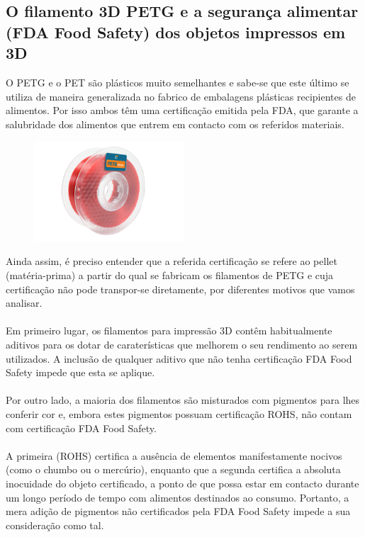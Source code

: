 \documentclass[11pt,a4paper]{article}
\begin{document}
	\subsection{O filamento 3D PETG e a segurança alimentar (FDA Food Safety) dos objetos impressos em 3D}O PETG e o PET são plásticos muito semelhantes e sabe-se que este último se utiliza de maneira generalizada no fabrico de embalagens plásticas recipientes de alimentos. Por isso ambos têm uma certificação emitida pela FDA, que garante a salubridade dos alimentos que entrem em contacto com os referidos materiais.
\begin{figure}[H]
\centering
\includegraphics[width=0.5\textwidth,cfbox=azul_marcos 1pt 0pt]{FOTOS/PETGKILOROJO}
\end{figure}
Ainda assim, é preciso entender que a referida certificação se refere ao pellet (matéria-prima) a partir do qual se fabricam os filamentos de PETG e cuja certificação não pode transpor-se diretamente, por diferentes motivos que vamos analisar.
\\\\
Em primeiro lugar, os filamentos para impressão 3D contêm habitualmente aditivos para os dotar de caraterísticas que melhorem o seu rendimento ao serem utilizados. A inclusão de qualquer aditivo que não tenha certificação FDA Food Safety impede que esta se aplique.
\\\\
Por outro lado, a maioria dos filamentos são misturados com pigmentos para lhes conferir cor e, embora estes pigmentos possuam certificação ROHS, não contam com certificação FDA Food Safety.
\\\\
A primeira (ROHS) certifica a ausência de elementos manifestamente nocivos (como o chumbo ou o mercúrio), enquanto que a segunda certifica a absoluta inocuidade do objeto certificado, a ponto de que possa estar em contacto durante um longo período de tempo com alimentos destinados ao consumo. Portanto, a mera adição de pigmentos não certificados pela FDA Food Safety impede a sua consideração como tal.
\end{document}
